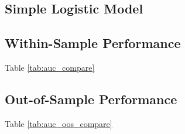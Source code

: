 \documentclass[10pt]{article} %
\begin{document}
    \subsection{Simple Logistic Model}

    \subsection{Within-Sample Performance}
    
    Table \ref{tab:auc_compare}

    \subsection{Out-of-Sample Performance}
    
    Table \ref{tab:auc_oos_compare} 


\newpage
\footnotesize


\end{document}
